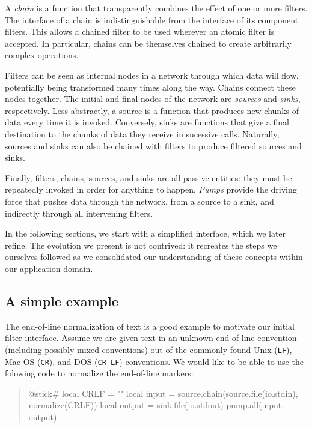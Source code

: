 \documentclass[10pt]{article}
\newcommand{\CR}{\texttt{CR}}
\newcommand{\LF}{\texttt{LF}}
\newcommand{\CRLF}{\texttt{CR~LF}}
\begin{document}
A \emph{chain} is a function that transparently combines the
effect of one or more filters. The interface of a chain is
indistinguishable from the interface of its component
filters.  This  allows a chained filter to be used wherever
an atomic filter is accepted. In particular, chains can be
themselves chained to create arbitrarily complex operations.

Filters can be seen as internal nodes in a network through
which data will flow, potentially being transformed many
times along the way.  Chains connect these nodes together.
The initial and final nodes of the network are
\emph{sources} and \emph{sinks}, respectively.  Less
abstractly, a source is a function that produces new chunks
of data every time it is invoked.  Conversely, sinks are
functions that give a final destination to the chunks of
data they receive in sucessive calls.  Naturally, sources
and sinks can also be chained with filters to produce
filtered sources and sinks.

Finally, filters, chains, sources, and sinks are all passive
entities: they must be repeatedly invoked in order for
anything to happen.  \emph{Pumps} provide the driving force
that pushes data through the network, from a source to a
sink, and indirectly through all intervening filters.

In the following sections, we start with a simplified
interface, which we later refine. The evolution we present
is not contrived: it recreates the steps we ourselves
followed as we consolidated our understanding of these
concepts within our application domain. 

\subsection{A simple example}

The end-of-line normalization of text is a good
example to motivate our initial filter interface. 
Assume we are given text in an unknown end-of-line
convention (including possibly mixed conventions) out of the
commonly found Unix (\LF), Mac OS (\CR), and
DOS (\CRLF) conventions. We would like to be able to 
use the folowing code to normalize the end-of-line markers: 
\begin{quote}
\begin{lua}
@stick#
local CRLF = ""
local input = source.chain(source.file(io.stdin), normalize(CRLF))
local output = sink.file(io.stdout)
pump.all(input, output)
%
\end{lua}
\end{quote}
\end{document}
